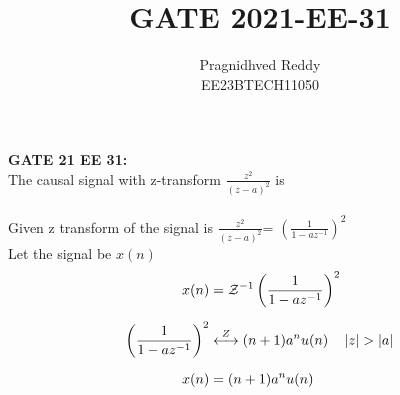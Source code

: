 \documentclass[journal,12pt,twocolumn]{IEEEtran}
\title{GATE 2021-EE-31}
\author{Pragnidhved Reddy\\EE23BTECH11050}
\date{}
\begin{document}
\maketitle
\newpage
\bigskip
\textbf{GATE 21 EE 31:}\\
The causal signal with z-transform $\frac{z^2}{(z-a)^{2}}$  is \\
\solution\\
Given z transform of the signal is $\frac{z^2}{(z-a)^{2}}$= $\left(\frac{1}{1-az^{-1}}\right)^2$\\
Let the signal be $x(n)$
\begin{align}
x(n)&=\mathcal{Z}^{-1}\left(\frac{1}{1-az^{-1}}\right)^2\\[6pt]
\left(\frac{1}{1-az^{-1}}\right)^2&\overset{Z}\longleftrightarrow (n+1)a^nu(n)\quad \left\vert z\right\vert>\left\vert a\right\vert\\[6pt] 
x(n)&=(n+1)a^n u(n)
\end{align}
\end{document}
